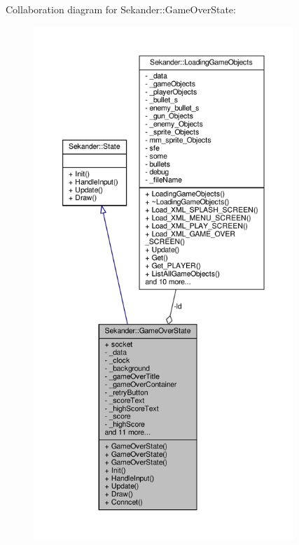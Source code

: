 Collaboration diagram for Sekander\+:\+:Game\+Over\+State\+:
\nopagebreak
\begin{figure}[H]
\begin{center}
\leavevmode
\includegraphics[height=550pt]{classSekander_1_1GameOverState__coll__graph}
\end{center}
\end{figure}
